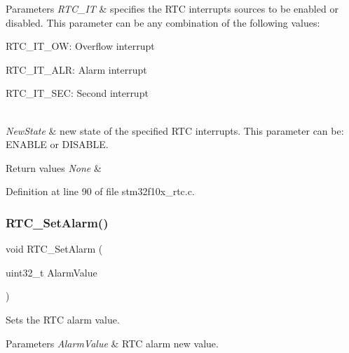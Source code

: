 \begin{DoxyParams}{Parameters}
{\em R\+T\+C\+\_\+\+IT} & specifies the R\+TC interrupts sources to be enabled or disabled. This parameter can be any combination of the following values\+: \begin{DoxyItemize}
\item R\+T\+C\+\_\+\+I\+T\+\_\+\+OW\+: Overflow interrupt \item R\+T\+C\+\_\+\+I\+T\+\_\+\+A\+LR\+: Alarm interrupt \item R\+T\+C\+\_\+\+I\+T\+\_\+\+S\+EC\+: Second interrupt \end{DoxyItemize}
\\
\hline
{\em New\+State} & new state of the specified R\+TC interrupts. This parameter can be\+: E\+N\+A\+B\+LE or D\+I\+S\+A\+B\+LE. \\
\hline
\end{DoxyParams}

\begin{DoxyRetVals}{Return values}
{\em None} & \\
\hline
\end{DoxyRetVals}


Definition at line 90 of file stm32f10x\+\_\+rtc.\+c.

\mbox{\label{group___r_t_c___private___functions_gaec644c636a30ab5e287ba60ffc77132c}} 
\subsubsection{\texorpdfstring{R\+T\+C\+\_\+\+Set\+Alarm()}{RTC\_SetAlarm()}}
{\footnotesize\ttfamily void R\+T\+C\+\_\+\+Set\+Alarm (\begin{DoxyParamCaption}\item[{uint32\+\_\+t}]{Alarm\+Value }\end{DoxyParamCaption})}



Sets the R\+TC alarm value. 


\begin{DoxyParams}{Parameters}
{\em Alarm\+Value} & R\+TC alarm new value. \\
\hline
\end{DoxyParams}

